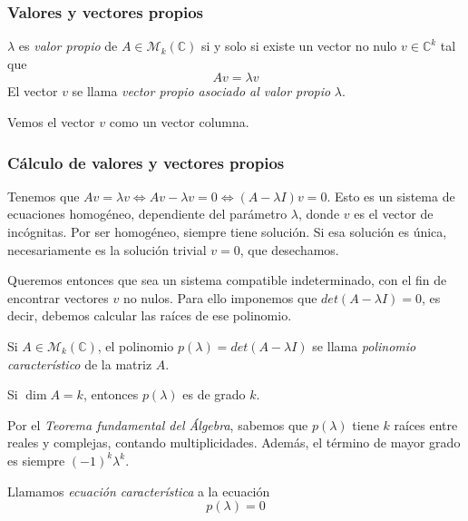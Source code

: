 \subsubsection{Valores y vectores propios}

\begin{ndef}
  $\lambda$ es \textit{valor propio} de $A \in \mathcal M_k (\mathbb C)$ si y solo si
  existe un vector no nulo $v \in \mathbb C^k$ tal que $$Av = \lambda v$$
  El vector $v$ se llama \textit{vector propio asociado al valor propio} $\lambda$.
\end{ndef}

\begin{nota}
  Vemos el vector $v$ como un vector columna.
\end{nota}

\subsubsection{Cálculo de valores y vectores propios}

  Tenemos que $Av = \lambda v \iff Av - \lambda v = 0 \iff (A -
  \lambda I)v = 0$. Esto es un sistema de ecuaciones homogéneo, dependiente del parámetro $\lambda$, donde $v$ es el vector de incógnitas. Por ser homogéneo, siempre tiene solución. Si esa solución es única, necesariamente es la solución trivial $v = 0$, que desechamos.

  Queremos entonces que sea un sistema compatible indeterminado, con el fin de encontrar vectores $v$ no nulos. Para ello imponemos que
  $det(A - \lambda I) = 0$, es decir, debemos calcular las raíces de ese polinomio.

  \begin{ndef} Si $A \in \mathcal M_k(\mathbb C)$, el polinomio $p(\lambda)= det (A-\lambda I)$ se llama \textit{polinomio característico} de la matriz $A$.

  Si $\dim A = k$, entonces $p(\lambda)$ es de grado $k$.

\end{ndef}
\begin{nota}
	Por el \textit{Teorema fundamental del Álgebra}, sabemos que $p(\lambda)$ tiene $k$ raíces entre reales y complejas, contando multiplicidades. Además, el término de mayor grado es siempre $(-1)^k\lambda^k$.
\end{nota}

\begin{ndef} Llamamos \textit{ecuación característica} a la ecuación $$p(\lambda) = 0$$

\end{ndef}

